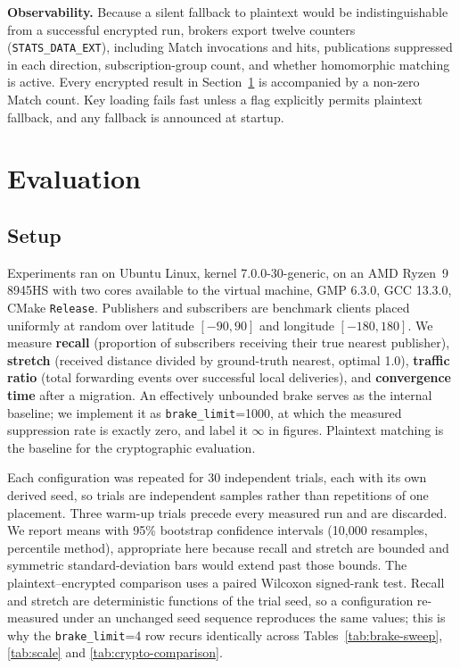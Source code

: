 \documentclass[10pt]{article}
\begin{document}
\textbf{Observability.} Because a silent fallback to plaintext would be indistinguishable from a successful encrypted run, brokers export twelve counters (\texttt{STATS\_DATA\_EXT}), including Match invocations and hits, publications suppressed in each direction, subscription-group count, and whether homomorphic matching is active. Every encrypted result in Section~\ref{sec:eval} is accompanied by a non-zero Match count. Key loading fails fast unless a flag explicitly permits plaintext fallback, and any fallback is announced at startup.

\section{Evaluation}
\label{sec:eval}

\subsection{Setup}

Experiments ran on Ubuntu Linux, kernel 7.0.0-30-generic, on an AMD Ryzen~9 8945HS with two cores available to the virtual machine, GMP 6.3.0, GCC 13.3.0, CMake \texttt{Release}. Publishers and subscribers are benchmark clients placed uniformly at random over latitude $[-90,90]$ and longitude $[-180,180]$. We measure \textbf{recall} (proportion of subscribers receiving their true nearest publisher), \textbf{stretch} (received distance divided by ground-truth nearest, optimal 1.0), \textbf{traffic ratio} (total forwarding events over successful local deliveries), and \textbf{convergence time} after a migration. An effectively unbounded brake serves as the internal baseline; we implement it as \texttt{brake\_limit}=1000, at which the measured suppression rate is exactly zero, and label it $\infty$ in figures. Plaintext matching is the baseline for the cryptographic evaluation.

Each configuration was repeated for 30 independent trials, each with its own derived seed, so trials are independent samples rather than repetitions of one placement. Three warm-up trials precede every measured run and are discarded. We report means with 95\% bootstrap confidence intervals (10{,}000 resamples, percentile method), appropriate here because recall and stretch are bounded and symmetric standard-deviation bars would extend past those bounds. The plaintext--encrypted comparison uses a paired Wilcoxon signed-rank test. Recall and stretch are deterministic functions of the trial seed, so a configuration re-measured under an unchanged seed sequence reproduces the same values; this is why the \texttt{brake\_limit}=4 row recurs identically across Tables~\ref{tab:brake-sweep}, \ref{tab:scale} and \ref{tab:crypto-comparison}.
\end{document}
